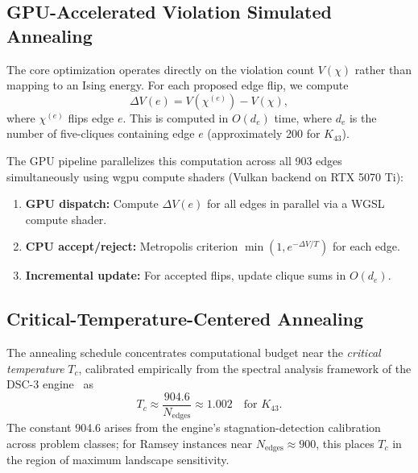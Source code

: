 \documentclass[11pt,a4paper]{article}
\theoremstyle{plain}
\theoremstyle{remark}
\begin{document}
\subsection{GPU-Accelerated Violation Simulated Annealing}

The core optimization operates directly on the violation count $V(\chi)$
rather than mapping to an Ising energy. For each proposed edge flip,
we compute
\[
  \Delta V(e) = V(\chi^{(e)}) - V(\chi),
\]
where $\chi^{(e)}$ flips edge $e$. This is computed in $O(d_e)$ time,
where $d_e$ is the number of five-cliques containing edge $e$
(approximately 200 for $K_{43}$).

The GPU pipeline parallelizes this computation across all 903 edges
simultaneously using wgpu compute shaders (Vulkan backend on RTX 5070 Ti):

\begin{enumerate}[leftmargin=2em]
  \item \textbf{GPU dispatch:} Compute $\Delta V(e)$ for all edges
    in parallel via a WGSL compute shader.
  \item \textbf{CPU accept/reject:} Metropolis criterion
    $\min(1, e^{-\Delta V / T})$ for each edge.
  \item \textbf{Incremental update:} For accepted flips, update
    clique sums in $O(d_e)$.
\end{enumerate}

\subsection{Critical-Temperature-Centered Annealing}

The annealing schedule concentrates computational budget near the
\emph{critical temperature} $T_c$, calibrated empirically from
the spectral analysis framework of the DSC-3 engine~\cite{daugherty2026spectral}
as
\[
  T_c \approx \frac{904.6}{N_{\text{edges}}} \approx 1.002
  \quad \text{for } K_{43}.
\]
The constant 904.6 arises from the engine's stagnation-detection
calibration across problem classes; for Ramsey instances near
$N_{\text{edges}} \approx 900$, this places $T_c$ in the region of
maximum landscape sensitivity.
\end{document}
